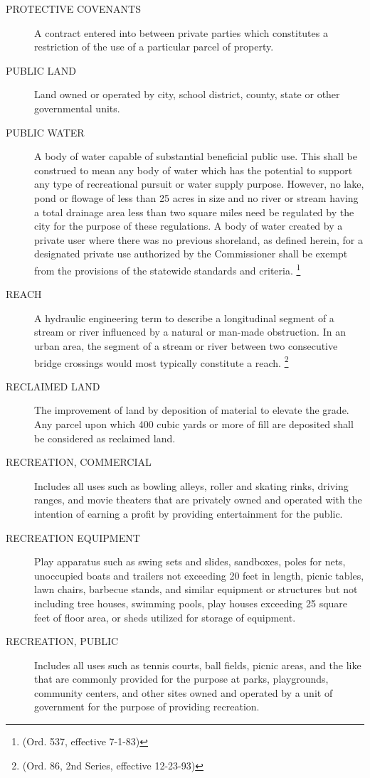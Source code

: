 \begin{description}
    \item[PROTECTIVE COVENANTS] A contract entered into between private parties which constitutes a restriction of the use of a particular parcel of property.
    \item[PUBLIC LAND] Land owned or operated by city, school district, county, state or other governmental units.
    \item[PUBLIC WATER] A body of water capable of substantial beneficial public use. This shall be construed to mean any body of water which has the potential to support any type of recreational pursuit or water supply purpose. However, no lake, pond or flowage of less than 25 acres in size and no river or stream having a total drainage area less than two square miles need be regulated by the city for the purpose of these regulations. A body of water created by a private user where there was no previous shoreland, as defined herein, for a designated private use authorized by the Commissioner shall be exempt from the provisions of the statewide standards and criteria. \footnote{(Ord. 537, effective 7-1-83)}
    \item[REACH] A hydraulic engineering term to describe a longitudinal segment of a stream or river influenced by a natural or man-made obstruction. In an urban area, the segment of a stream or river between two consecutive bridge crossings would most typically constitute a reach. \footnote{(Ord. 86, 2nd Series, effective 12-23-93)}
    \item[RECLAIMED LAND] The improvement of land by deposition of material to elevate the grade.  Any parcel upon which 400 cubic yards or more of fill are deposited shall be considered as reclaimed land.
    \item[RECREATION, COMMERCIAL] Includes all uses such as bowling alleys, roller and skating rinks, driving ranges, and movie theaters that are privately owned and operated with the intention of earning a profit by providing entertainment for the public.
    \item[RECREATION EQUIPMENT] Play apparatus such as swing sets and slides, sandboxes, poles for nets, unoccupied boats and trailers not exceeding 20 feet in length, picnic tables, lawn chairs, barbecue stands, and similar equipment or structures but not including tree houses, swimming pools, play houses exceeding 25 square feet of floor area, or sheds utilized for storage of equipment.
    \item[RECREATION, PUBLIC] Includes all uses such as tennis courts, ball fields, picnic areas, and the like that are commonly provided for the purpose at parks, playgrounds, community centers, and other sites owned and operated by a unit of government for the purpose of providing recreation.

\end{description}
